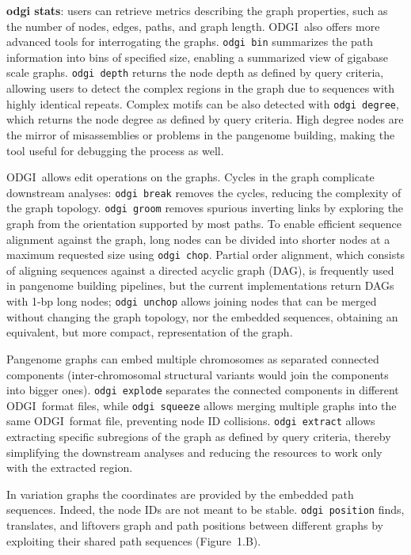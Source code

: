 \documentclass{bioinfo}
\newcommand{\odgi}{ODGI}
\newcommand{\cmdbf}[1]{{\textbf{#1}}}
\newcommand{\topic}[1]{{\cmdbf{#1}}:}
\begin{document}
    \topic{odgi stats} users can retrieve metrics describing the graph properties, such as the number of
    nodes, edges, paths, and graph length. \odgi\ also offers more advanced tools for interrogating the graphs.
    \texttt{odgi bin} summarizes the path information into bins of specified size, enabling a summarized view of
    gigabase scale graphs. \texttt{odgi depth} returns the node depth as defined by query criteria, allowing users to
    detect the complex regions in the graph due to sequences with highly identical repeats. Complex motifs can be also
    detected with \texttt{odgi degree}, which returns the node degree as defined by query criteria. High degree nodes
    are the mirror of misassemblies or problems in the pangenome building, making the tool useful for debugging the
    process as well.


    \odgi\ allows edit operations on the graphs. Cycles in the graph complicate downstream analyses: \texttt{odgi break}
    removes the cycles, reducing the complexity of the graph topology. \texttt{odgi groom} removes spurious inverting
    links by exploring the graph from the orientation supported by most paths. To enable efficient sequence alignment
    against the graph, long nodes can be divided into shorter nodes at a maximum requested size using
    \texttt{odgi chop}. Partial order alignment, which consists of aligning sequences against a directed acyclic graph
    (DAG), is frequently used in pangenome building pipelines, but the current implementations return DAGs with 1-bp
    long nodes; \texttt{odgi unchop} allows joining nodes that can be merged without changing the graph topology, nor
    the embedded sequences, obtaining an equivalent, but more compact, representation of the graph.

    Pangenome graphs can embed multiple chromosomes as separated connected components (inter-chromosomal structural
    variants would join the components into bigger ones). \texttt{odgi explode} separates the connected components in
    different \odgi\ format files, while \texttt{odgi squeeze} allows merging multiple graphs into the same \odgi\ format
    file, preventing node ID collisions. \texttt{odgi extract} allows extracting specific subregions of the graph as
    defined by query criteria, thereby simplifying the downstream analyses and reducing the resources to work only
    with the extracted region.

    In variation graphs the coordinates are provided by the embedded path sequences. Indeed, the node IDs are not
    meant to be stable. \texttt{odgi position} finds, translates, and liftovers graph and path positions between
    different graphs by exploiting their shared path sequences (Figure~1.B\vphantom{\ref{fig:01}}).
\end{document}
